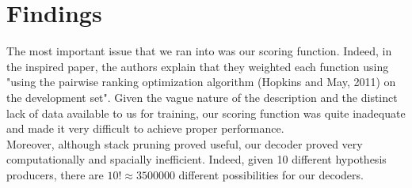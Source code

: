 \documentclass{article}
\begin{document}
\section{Findings}
The most important issue that we ran into was our scoring function. Indeed, in the inspired paper, the authors explain that they weighted each function using "using the pairwise ranking optimization algorithm (Hopkins and May, 2011) on the development set". Given the vague nature of the description and the distinct lack of data available to us for training, our scoring function was quite inadequate and made it very difficult to achieve proper performance.\\

Moreover, although stack pruning proved useful, our decoder proved very computationally and spacially inefficient. Indeed, given 10 different hypothesis producers, there are $10! \approx 3 500 000$ different possibilities for our decoders. 
\end{document}
